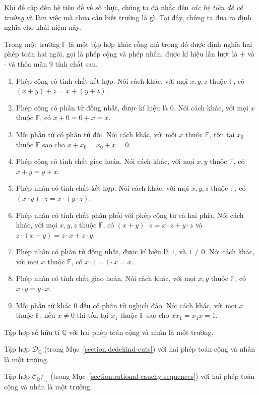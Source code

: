 Khi đề cập đến hệ tiên đề về số thực, chúng ta đã nhắc đến \textit{các hệ tiên đề về trường} và làm việc mà chưa cần biết trường là gì. Tại đây, chúng ta đưa ra định nghĩa cho khái niệm này.
\begin{definition}
    Trong một trường $\mathbb{F}$ là một tập hợp khác rỗng mà trong đó được định nghĩa hai phép toán hai ngôi, gọi là phép cộng và phép nhân, được kí hiệu lần lượt là $+$ và $\cdot$ và thỏa mãn 9 tính chất sau.
    \begin{enumerate}[label={(F\arabic*)},itemsep=0pt]
        \item Phép cộng có tính chất kết hợp. Nói cách khác, với mọi $x, y, z$ thuộc $\mathbb{F}$, có $(x + y) + z = x + (y + z)$.
        \item Phép cộng có phần tử đồng nhất, được kí hiệu là $0$. Nói cách khác, với mọi $x$ thuộc $\mathbb{F}$, có $x + 0 = 0 + x = x$.
        \item Mỗi phần tử có phần tử đối. Nói cách khác, với mỗi $x$ thuộc $\mathbb{F}$, tồn tại $x_{0}$ thuộc $\mathbb{F}$ sao cho $x + x_{0} = x_{0} + x = 0$.
        \item Phép cộng có tính chất giao hoán. Nói cách khác, với mọi $x, y$ thuộc $\mathbb{F}$, có $x + y = y + x$.
        \item Phép nhân có tính chất kết hợp. Nói cách khác, với mọi $x, y, z$ thuộc $\mathbb{F}$, có $(x\cdot y)\cdot z = x\cdot (y\cdot z)$.
        \item Phép nhân có tính chất phân phối với phép cộng từ cả hai phía. Nói cách khác, với mọi $x, y, z$ thuộc $\mathbb{F}$, có $(x + y)\cdot z = x\cdot z + y\cdot z$ và $z\cdot (x + y) = z\cdot x + z\cdot y$.
        \item Phép nhân có phần tử đồng nhất, được kí hiệu là $1$, và $1\ne 0$. Nói cách khác, với mọi $x$ thuộc $\mathbb{F}$, có $x\cdot 1 = 1\cdot x = x$.
        \item Phép nhân có tính chất giao hoán. Nói cách khác, với mọi $x, y$ thuộc $\mathbb{F}$, có $x\cdot y = y\cdot x$.
        \item Mỗi phần tử khác $0$ đều có phần tử nghịch đảo. Nói cách khác, với mọi $x$ thuộc $\mathbb{F}$, nếu $x\ne 0$ thì tồn tại $x_{1}$ thuộc $\mathbb{F}$ sao cho $xx_{1} = x_{1}x = 1$.
    \end{enumerate}
\end{definition}

\begin{example}
    Tập hợp số hữu tỉ $\mathbb{Q}$ với hai phép toán cộng và nhân là một trường.

    \noindent Tập hợp $\mathscr{D}_{\mathbb{Q}}$ (trong Mục~\ref{section:dedekind-cuts}) với hai phép toán cộng và nhân là một trường.

    \noindent Tập hợp $\mathscr{C}_{\mathbb{Q}}/_{\sim}$ (trong Mục~\ref{section:rational-cauchy-sequences}) với hai phép toán cộng và nhân là một trường.
\end{example}

